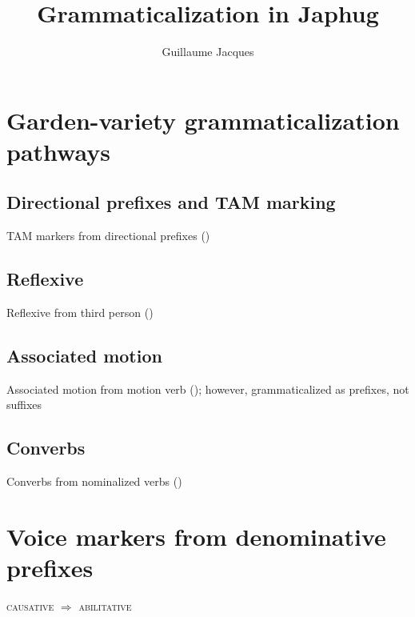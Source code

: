 \documentclass[oldfontcommands,oneside,a4paper,11pt]{article}
\begin{document}
 

\title{Grammaticalization in Japhug}
\author{Guillaume Jacques}
\maketitle
\linenumbers
\section{Garden-variety grammaticalization pathways}

\subsection{Directional prefixes and TAM marking} \label{sec:directional}
TAM markers from directional prefixes (\citealt{lin11direction})

\subsection{Reflexive}
Reflexive from third person (\citealt{jacques10refl})

\subsection{Associated motion}
Associated motion from motion verb (\citealt{jacques13harmonization}); however, grammaticalized as prefixes, not suffixes

\subsection{Converbs}
Converbs from nominalized verbs (\citealt{jacques14linking})

\section{Voice markers from denominative prefixes} \label{sec:voice}

\citealt{jacques13tropative}
\citealt{jacques12incorp}
\citealt{jacques14antipassive}
\citealt{jacques15causative}

\begin{exe}
\ex
\glt \textsc{causative} $\Rightarrow$ \textsc{abilitative}
\end{exe}
\end{document}
